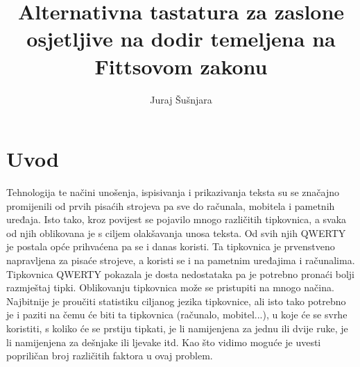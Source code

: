 \documentclass[times, utf8, zavrsni, numeric]{fer}
\begin{document}

\title{Alternativna tastatura za zaslone osjetljive na dodir temeljena na Fittsovom zakonu}

\author{Juraj Šušnjara}

\maketitle




\tableofcontents

\chapter{Uvod}

Tehnologija te načini unošenja, ispisivanja i prikazivanja teksta su se značajno promijenili od prvih pisaćih strojeva pa sve do računala, mobitela i pametnih uređaja. Isto tako, kroz povijest se pojavilo mnogo različitih tipkovnica, a svaka od njih oblikovana je s ciljem olakšavanja unosa teksta. Od svih njih QWERTY je postala opće prihvaćena pa se i danas koristi. Ta tipkovnica je prvenstveno napravljena za pisaće strojeve, a koristi se i na pametnim uređajima i računalima. Tipkovnica QWERTY pokazala je dosta nedostataka pa je potrebno pronaći bolji razmještaj tipki. Oblikovanju tipkovnica može se pristupiti na mnogo načina. Najbitnije je proučiti statistiku ciljanog jezika tipkovnice, ali isto tako potrebno je i paziti na čemu će biti ta tipkovnica (računalo, mobitel...), u koje će se svrhe koristiti, s koliko će se prstiju tipkati, je li namijenjena za jednu ili dvije ruke, je li namijenjena za dešnjake ili ljevake itd. Kao što vidimo moguće je uvesti popriličan broj različitih faktora u ovaj problem.
\end{document}

